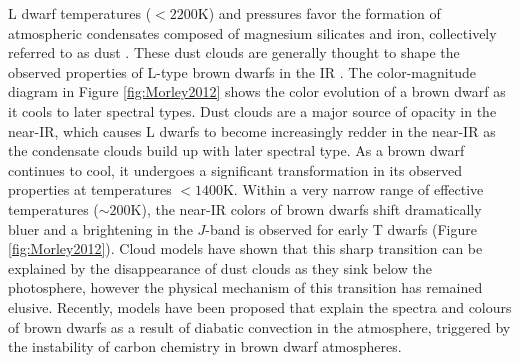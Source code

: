 \documentclass[12pt]{article}
\begin{document}
\begin{justify}
\noindent L dwarf temperatures ($<2200$K) and pressures favor the formation of atmospheric condensates composed of magnesium silicates and iron, collectively referred to as dust \citep{Tsuji1999, Allard2001}. These dust clouds are generally thought to shape the observed properties of L-type brown dwarfs in the IR \citep{Helling2014, Marley2015}. The color-magnitude diagram in Figure \ref{fig:Morley2012} shows the color evolution of a brown dwarf as it cools to later spectral types. Dust clouds are a major source of opacity in the near-IR, which causes L dwarfs to become increasingly redder in the near-IR as the condensate clouds build up with later spectral type. 
As a brown dwarf continues to cool, it undergoes a significant transformation in its observed properties at temperatures $<1400$K. 
Within a very narrow range of effective temperatures ($\sim200$K), the near-IR colors of brown dwarfs shift dramatically bluer and a brightening in the $J$-band is observed for early T dwarfs (Figure \ref{fig:Morley2012}). Cloud models \citep[e.g.][]{Marley2015, Charnay2018} have shown that this sharp transition can be explained by the disappearance of dust clouds as they sink below the photosphere, however the physical mechanism of this transition has remained elusive.
Recently,  models have been proposed that explain the spectra and colours of brown dwarfs as a result of diabatic convection in the atmosphere, triggered by the instability of carbon chemistry in brown dwarf atmospheres\citep{Tremblin2019}.  \smallskip



\end{justify}
\end{document}
